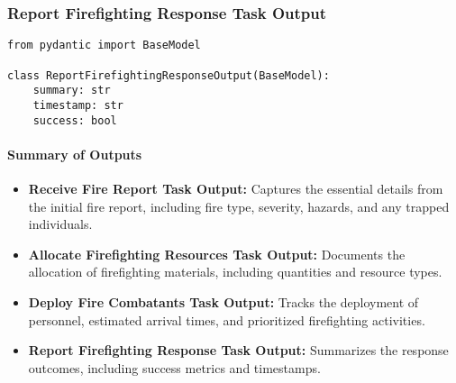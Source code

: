 \subsubsection{Report Firefighting Response Task Output}
\begin{lstlisting}[caption={Pydantic model for Report Firefighting Response Task Output}]
from pydantic import BaseModel

class ReportFirefightingResponseOutput(BaseModel):
    summary: str
    timestamp: str
    success: bool
\end{lstlisting}

\paragraph{Summary of Outputs}
\begin{itemize}
\item \textbf{Receive Fire Report Task Output:} Captures the essential details from the initial fire report, including fire type, severity, hazards, and any trapped individuals.
\item \textbf{Allocate Firefighting Resources Task Output:} Documents the allocation of firefighting materials, including quantities and resource types.
\item \textbf{Deploy Fire Combatants Task Output:} Tracks the deployment of personnel, estimated arrival times, and prioritized firefighting activities.
\item \textbf{Report Firefighting Response Task Output:} Summarizes the response outcomes, including success metrics and timestamps.
\end{itemize}


